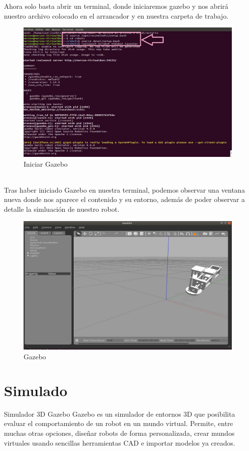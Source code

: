 \documentclass[11pt,a4paper,oldfontcommands,oneside]{memoir}
\begin{document}
Ahora solo basta abrir un terminal, donde iniciaremos gazebo y nos abrirá nuestro archivo colocado en el arrancador y en nuestra carpeta de trabajo.
\begin{figure}[h]
	\includegraphics[scale=.75]{iniciargaz.png}
	\caption{Iniciar Gazebo}
	\label{Imagen 8}
\end{figure}\\
Tras haber iniciado Gazebo en nuestra terminal, podemos observar una ventana nueva donde nos aparece el contenido y su entorno, además de poder observar a detalle la simluación de nuestro robot.
\begin{figure}[h]
	\includegraphics[scale=.75]{gaz.png}
	\caption{Gazebo}
	\label{Imagen 9}
\end{figure}
\chapter{Simulado}
Simulador 3D Gazebo
Gazebo es un simulador de entornos 3D que posibilita evaluar el comportamiento de un robot en un mundo virtual. Permite, entre muchas otras opciones, diseñar robots de forma personalizada, crear mundos virtuales usando sencillas herramientas CAD e importar modelos ya creados.
\end{document}
